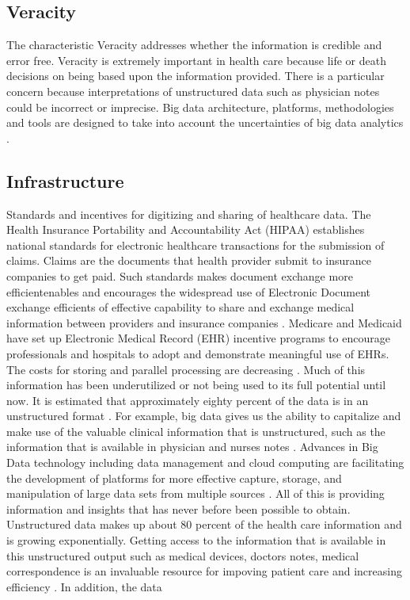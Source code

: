 \documentclass[sigconf]{acmart}
\begin{document}
\subsection{Veracity}

The characteristic Veracity addresses whether the information is credible and error free. Veracity is extremely important in health care because life or death decisions on being based upon the information provided. There is a particular concern because interpretations of unstructured data such as physician notes could be incorrect or imprecise. Big data architecture, platforms, methodologies and tools are designed to take into account the uncertainties of big data analytics \cite{springer}. 

\subsection{Infrastructure}
Standards and incentives for digitizing and sharing of healthcare data. 
The Health Insurance Portability and Accountability Act (HIPAA) establishes national standards for electronic healthcare transactions for the submission of claims. Claims are the documents that health provider submit to insurance companies to get paid. Such standards makes document exchange more efficientenables and encourages the widespread use of Electronic Document exchange efficients of effective capability to share and exchange medical information between providers and insurance companies \cite{www-google-McDonald}.
Medicare and Medicaid have set up Electronic Medical Record (EHR) incentive programs to encourage professionals and hospitals to adopt and demonstrate meaningful use of EHRs. 
The costs for storing and parallel processing are decreasing \cite{www-google-McDonald}. 
Much of this information has been underutilized or not being used to its full potential until now. It is estimated that approximately eighty percent of the data is in an unstructured format \cite{www-google-McDonald}. For example, big data gives us the ability to capitalize and make use of the valuable clinical information that is unstructured, such as the information that is available in physician and nurses notes \cite{www-google-HlthCat}.  Advances in Big Data technology including data management and cloud computing are facilitating the development of platforms for more effective capture, storage, and manipulation of large data sets from multiple sources \cite{springer}.  All of this is providing information and insights that has never before been possible to obtain.
Unstructured data makes up about 80 percent of the health care information and is growing exponentially. Getting access to the information that is available in this unstructured output such as medical devices, doctors notes, medical correspondence is an invaluable resource for impoving patient care and increasing efficiency \cite{www-google-McDonald}. In addition, the data 
\end{document}
